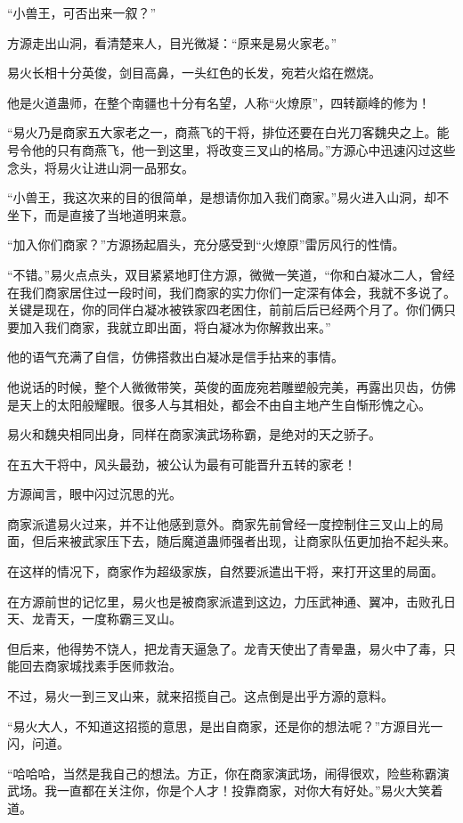 \begin{this_body}
“小兽王，可否出来一叙？”

方源走出山洞，看清楚来人，目光微凝：“原来是易火家老。”

易火长相十分英俊，剑目高鼻，一头红色的长发，宛若火焰在燃烧。

他是火道蛊师，在整个南疆也十分有名望，人称“火燎原”，四转巅峰的修为！

“易火乃是商家五大家老之一，商燕飞的干将，排位还要在白光刀客魏央之上。能号令他的只有商燕飞，他一到这里，将改变三叉山的格局。”方源心中迅速闪过这些念头，将易火让进山洞一品邪女。

“小兽王，我这次来的目的很简单，是想请你加入我们商家。”易火进入山洞，却不坐下，而是直接了当地道明来意。

“加入你们商家？”方源扬起眉头，充分感受到“火燎原”雷厉风行的性情。

“不错。”易火点点头，双目紧紧地盯住方源，微微一笑道，“你和白凝冰二人，曾经在我们商家居住过一段时间，我们商家的实力你们一定深有体会，我就不多说了。关键是现在，你的同伴白凝冰被铁家四老困住，前前后后已经两个月了。你们俩只要加入我们商家，我就立即出面，将白凝冰为你解救出来。”

他的语气充满了自信，仿佛搭救出白凝冰是信手拈来的事情。

他说话的时候，整个人微微带笑，英俊的面庞宛若雕塑般完美，再露出贝齿，仿佛是天上的太阳般耀眼。很多人与其相处，都会不由自主地产生自惭形愧之心。

易火和魏央相同出身，同样在商家演武场称霸，是绝对的天之骄子。

在五大干将中，风头最劲，被公认为最有可能晋升五转的家老！

方源闻言，眼中闪过沉思的光。

商家派遣易火过来，并不让他感到意外。商家先前曾经一度控制住三叉山上的局面，但后来被武家压下去，随后魔道蛊师强者出现，让商家队伍更加抬不起头来。

在这样的情况下，商家作为超级家族，自然要派遣出干将，来打开这里的局面。

在方源前世的记忆里，易火也是被商家派遣到这边，力压武神通、翼冲，击败孔日天、龙青天，一度称霸三叉山。

但后来，他得势不饶人，把龙青天逼急了。龙青天使出了青晕蛊，易火中了毒，只能回去商家城找素手医师救治。

不过，易火一到三叉山来，就来招揽自己。这点倒是出乎方源的意料。

“易火大人，不知道这招揽的意思，是出自商家，还是你的想法呢？”方源目光一闪，问道。

“哈哈哈，当然是我自己的想法。方正，你在商家演武场，闹得很欢，险些称霸演武场。我一直都在关注你，你是个人才！投靠商家，对你大有好处。”易火大笑着道。


\end{this_body}
